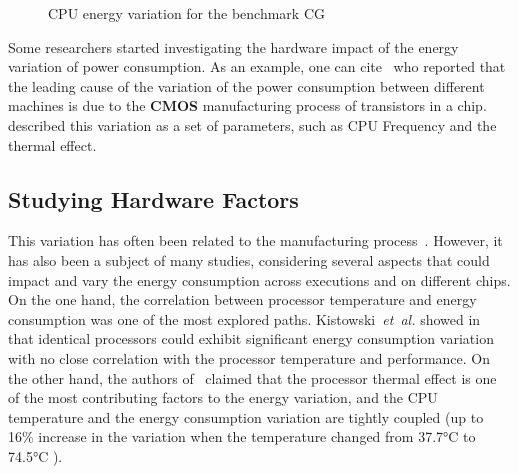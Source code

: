 \begin{figure}%
    \caption{CPU energy variation for the benchmark \textsf{CG}}\label{fig:motivation}
\end{figure}
Some researchers started investigating the hardware impact of the energy variation of power consumption.
As an example, one can cite~\cite{borkar_designing_2005,tschanz_adaptive_2002} who reported that the leading cause of the variation of the power consumption between different machines is due to the \textbf{CMOS} manufacturing process of transistors in a chip.
\cite{heinrich_predicting} described this variation as a set of parameters, such as CPU Frequency and the thermal effect.
\subsection{Studying Hardware Factors}
This variation has often been related to the manufacturing process~\cite{coles_comparing_2014}. However, it has also been a subject of many studies, considering several aspects that could impact and vary the energy consumption across executions and on different chips.
On the one hand, the correlation between processor temperature and energy consumption was one of the most explored paths.
Kistowski~\emph{et~al.} showed in~\cite{joakim_v_kisroski_variations_2016} that identical processors could exhibit significant energy consumption variation with no close correlation with the processor temperature and performance.
On the other hand, the authors of~\cite{wang_potential_2018} claimed that the processor thermal effect is one of the most contributing factors to the energy variation, and the CPU temperature and the energy consumption variation are tightly coupled (up to 16\% increase in the variation when the temperature changed from 37.7°C to 74.5°C ).

